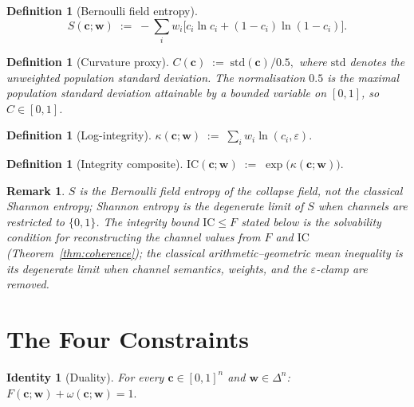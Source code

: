 \documentclass[
  aps,
  prd,
  twocolumn,
  superscriptaddress,
  nofootinbib,
  floatfix
]{revtex4-2}
\newtheorem{definition}[theorem]{Definition}
\newtheorem{identity}[theorem]{Identity}
\newtheorem{remark}{Remark}
\newcommand{\eps}{\varepsilon}
\newcommand{\tvec}{\mathbf{c}}
\newcommand{\wvec}{\mathbf{w}}
\newcommand{\IC}{\mathrm{IC}}
\newcommand{\stddev}{\mathrm{std}}
\begin{document}
\begin{definition}[Bernoulli field entropy]\label{def:S}
\begin{equation}
  S(\tvec;\wvec) \;:=\; -\sum_i w_i \big[c_i\ln c_i + (1-c_i)\ln(1-c_i)\big].
\end{equation}
\end{definition}

\begin{definition}[Curvature proxy]\label{def:C}
$C(\tvec) \;:=\; \stddev(\tvec)/0.5,$
where $\stddev$ denotes the unweighted population standard
deviation.  The normalisation $0.5$ is the maximal population
standard deviation attainable by a bounded variable on $[0,1]$,
so $C\in[0,1]$.
\end{definition}

\begin{definition}[Log-integrity]\label{def:kappa}
$\kappa(\tvec;\wvec) \;:=\; \sum_i w_i \ln(c_i,\eps).$
\end{definition}

\begin{definition}[Integrity composite]\label{def:IC}
$\IC(\tvec;\wvec) \;:=\; \exp\!\big(\kappa(\tvec;\wvec)\big).$
\end{definition}

\begin{remark}
$S$ is the Bernoulli field entropy of the collapse field, not the
classical Shannon entropy; Shannon entropy is the degenerate
limit of $S$ when channels are restricted to $\{0,1\}$.  The
integrity bound $\IC\le F$ stated below is the solvability
condition for reconstructing the channel values from $F$ and
$\IC$ (Theorem~\ref{thm:coherence}); the classical
arithmetic--geometric mean inequality is its degenerate limit
when channel semantics, weights, and the $\eps$-clamp are
removed.
\end{remark}

\section{The Four Constraints}\label{sec:identities}

\begin{identity}[Duality]\label{id:duality}
For every $\tvec\in[0,1]^n$ and $\wvec\in\Delta^n$:
$F(\tvec;\wvec) + \omega(\tvec;\wvec) = 1.$
\end{identity}
\end{document}
